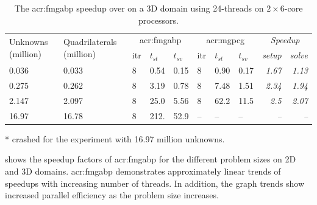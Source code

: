 \begin{table}[t]
	\centering
	\begin{threeparttable}[c]
		\caption[The \acrshort{acr:fmgabp} speedup over  on a 3D domain.]{The \acrshort{acr:fmgabp} speedup over  on a 3D domain using 24-threads on $2\times$6-core processors.} \label{tbl:fmgabpHelm3D}
		\begin{tabular}{llllllll>{\itshape}r>{\itshape}r} \toprule
			\multirow{2}{22mm}{Unknowns (million)} & \multirow{2}{27mm}{Quadrilaterals (million)} & \multicolumn{3}{c}{\gls{acr:fmgabp}} & \multicolumn{3}{c}{\gls{acr:mgpcg}} & \multicolumn{2}{c}{\textit{Speedup}}\tabularnewline
			\cmidrule(r){3-5} \cmidrule(r){6-8}\cmidrule(r){9-10}
			         &       & itr & $t_{st} $ & $t_{sv}  $ & itr & $t_{st}$      & $t_{sv}$ & setup & solve\tabularnewline
			\midrule
			0.036 & 0.033 & 8 & 0.54 & 0.15 & 8            & 0.90 & 0.17 & 1.67 & 1.13 \tabularnewline
			0.275 & 0.262 & 8 & 3.19 & 0.78 & 8            & 7.48 & 1.51 & 2.34 & 1.94 \tabularnewline
			2.147 & 2.097 & 8 & 25.0 & 5.56 & 8            & 62.2 & 11.5 & 2.5  & 2.07 \tabularnewline
			16.97 & 16.78 & 8 & 212. & 52.9 & -- \tnote{*} & --   & --   & --   & --   \tabularnewline
			\bottomrule
		\end{tabular}
		\begin{tablenotes}
			\begin{footnotesize}
			\item[*] { crashed for the experiment with 16.97 million unknowns.}
			\end{footnotesize}
		\end{tablenotes}
	\end{threeparttable}
\end{table}


 shows the speedup factors of \gls{acr:fmgabp} for the different problem sizes on 2D and 3D domains.
\gls{acr:fmgabp} demonstrates approximately linear trends of speedups with increasing number of threads.
In addition, the graph trends show increased parallel efficiency as the problem size increases.

